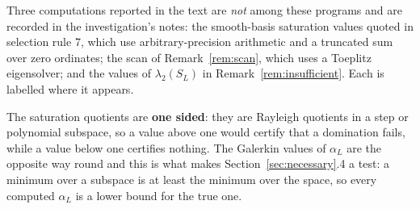 Three computations reported in the text are \emph{not} among these programs and
are recorded in the investigation's notes: the smooth-basis saturation values
quoted in selection rule 7, which use arbitrary-precision arithmetic and a
truncated sum over zero ordinates; the scan of Remark~\ref{rem:scan}, which uses
a Toeplitz eigensolver; and the values of $\lambda_2(S_L)$ in
Remark~\ref{rem:insufficient}. Each is labelled where it appears.

The saturation quotients are \textbf{one sided}: they are Rayleigh quotients in a
step or polynomial subspace, so a value above one would certify that a
domination fails, while a value below one certifies nothing. The Galerkin values
of $\alpha_L$ are the opposite way round and this is what makes
Section~\ref{sec:necessary}.4 a test: a minimum over a subspace is at least the
minimum over the space, so every computed $\alpha_L$ is a lower bound for the
true one.
